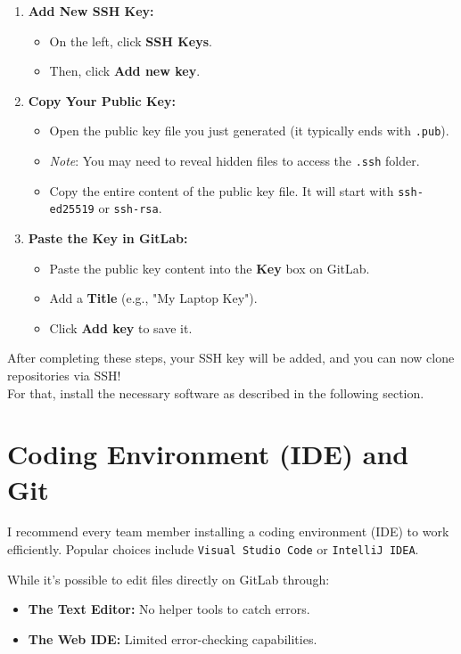\begin{enumerate}
    \item \textbf{Add New SSH Key:}
    \begin{itemize}
        \item On the left, click \textbf{SSH Keys}.
        \item Then, click \textbf{Add new key}.
    \end{itemize}

    \item \textbf{Copy Your Public Key:}
    \begin{itemize}
        \item Open the public key file you just generated (it typically ends with \texttt{.pub}).
        \item \textit{Note}: You may need to reveal hidden files to access the \texttt{.ssh} folder.
        \item Copy the entire content of the public key file.
        It will start with \texttt{ssh-ed25519} or \texttt{ssh-rsa}.
    \end{itemize}

    \item \textbf{Paste the Key in GitLab:}  
    \begin{itemize}
        \item Paste the public key content into the \textbf{Key} box on GitLab.
        \item Add a \textbf{Title} (e.g., "My Laptop Key").
        \item Click \textbf{Add key} to save it.
    \end{itemize}
\end{enumerate}

After completing these steps, your SSH key will be added, and you can now clone repositories via SSH! \\
For that, install the necessary software as described in the following section.


\section{Coding Environment (IDE) and Git} \label{sec:ide}  
I recommend every team member installing a coding environment (IDE) to work efficiently.
Popular choices include \texttt{Visual Studio Code} or \texttt{IntelliJ IDEA}. \\ \newline

While it's possible to edit files directly on GitLab through:
\begin{itemize}
    \item \textbf{The Text Editor:} No helper tools to catch errors.
    \item \textbf{The Web IDE:} Limited error-checking capabilities. 
\end{itemize}

